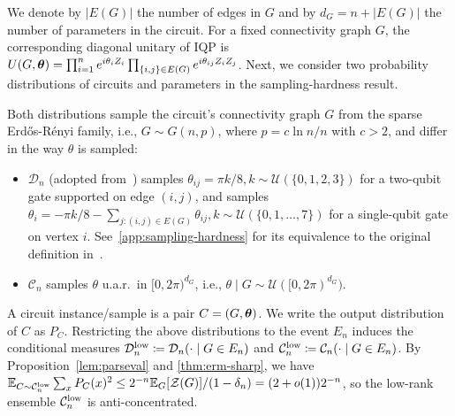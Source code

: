 \documentclass{article}
\theoremstyle{plain}
\theoremstyle{definition}
\theoremstyle{remark}
\begin{document}
We denote by $|E(G)|$ the number of edges in $G$ and by $d_G = n + |E(G)|$ the number of parameters in the circuit. For a fixed connectivity graph $G$, the corresponding diagonal unitary of IQP is $U(G,{\bm{\theta}})=\prod_{i=1}^n e^{i\theta_i Z_i}\prod_{\{i,j\}\in E(G)}e^{i\theta_{ij}Z_iZ_j}$. Next, we consider two probability distributions of circuits and parameters in the sampling-hardness result. 

Both distributions sample the circuit's connectivity graph $G$ from the sparse Erd\H os-R\'enyi family, i.e., $G\sim G(n,p)$, where $p=c\ln n/n$ with $c>2$, and differ in the way $\theta$ is sampled: 
\begin{itemize}
    \item $\mathcal{D}_n$ (adopted from~\cite{Bremner17}) samples $\theta_{ij}=\pi k / 8, k\sim\mathcal{U}(\{0, 1,2,3\})$ for a two-qubit gate supported on edge $(i,j)$, and samples $\theta_{i}=-\pi k / 8 - \sum_{j\colon (i,j)\in E(G)} \theta_{ij}, k\sim\mathcal{U}(\{0, 1,\ldots,7\})$ for a single-qubit gate on vertex $i$. See~\cref{app:sampling-hardness} for its equivalence to the original definition in~\cite{Bremner17}.
    \item $\mathcal{C}_n$ samples $\theta$ u.a.r.~in $[0,2\pi)^{d_G}$, i.e., $\theta \mid G\sim \mathcal{U}([0,2\pi)^{d_G})$.
\end{itemize}
A circuit instance/sample is a pair $C=(G,{\bm{\theta}})$. We write the output distribution of $C$ as $P_C$. Restricting the above distributions to the event $E_n$ induces the
conditional measures $\mathcal{D}_n^{\rm low} \coloneqq \mathcal{D}_n(\cdot\mid G\in E_n)$ and $\mathcal{C}_n^{\rm low} \coloneqq \mathcal{C}_n(\cdot\mid G\in E_n)$. By Proposition~\ref{lem:parseval} and \cref{thm:erm-sharp}, we have $\mathbb{E}_{C\sim\mathcal{C}_n^{\rm low}}\sum_x P_C(x)^2 \leq 2^{-n}\mathbb{E}_G[\mathcal Z(G)]/(1-\delta_n) =(2+o(1))2^{-n}$, so the low-rank ensemble $\mathcal{C}_n^{\rm low}$ is anti-concentrated.
\end{document}
